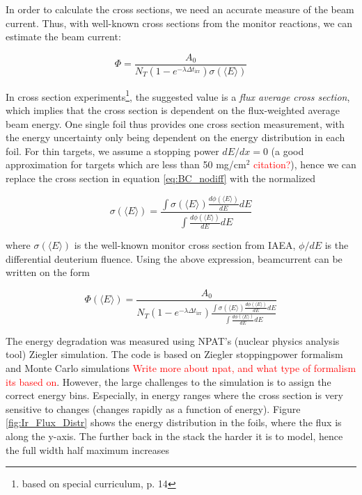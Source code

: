 \documentclass[a4paper,11pt,twoside]{book}
\begin{document}
\noindent 
In order to calculate the cross sections, we need an accurate measure of the beam current. Thus, with well-known cross sections from the monitor reactions, we can estimate the beam current: 

\begin{equation} \label{eq:BC_nodiff}
    \Phi = \frac{A_0}{N_T (1-e^{-\lambda \Delta t_\text{irr}})\sigma(\langle E\rangle)}
\end{equation}

\noindent 
In cross section experiments\footnote{based on special curriculum, p. 14}, the suggested value is a \textit{flux average cross section}, which implies that the cross section is dependent on the flux-weighted average beam energy. One single foil thus provides one cross section measurement, with the energy uncertainty only being dependent on the energy distribution in each foil. For thin targets, we assume a stopping power $dE/dx=0$ (a good approximation for targets which are less than 50 mg/cm$^2$ \textcolor{red}{citation?}), hence we can replace the cross section in equation \ref{eq:BC_nodiff} with the normalized 

\begin{equation}
    \sigma(\langle E \rangle) = \frac{\int \sigma(\langle E \rangle) \frac{d\phi(\langle E \rangle)}{dE}dE}{\int \frac{d\phi(\langle E \rangle)}{dE}dE}
\end{equation}

\noindent where $\sigma(\langle E \rangle)$ is the well-known monitor cross section from IAEA, $\phi/dE$ is the differential deuterium fluence.  Using the above expression, beamcurrent can be written on the form 

\begin{equation}
    \Phi(\langle E \rangle) = \frac{A_0}{N_T (1-e^{-\lambda \Delta t_\text{irr}})\frac{\int \sigma(\langle E \rangle) \frac{d\phi(\langle E \rangle)}{dE}dE}{\int \frac{d\phi(\langle E \rangle)}{dE}dE}}
\end{equation}

\noindent 
The energy degradation was measured using NPAT's (nuclear physics analysis tool) Ziegler simulation. The code is based on Ziegler stoppingpower formalism and Monte Carlo simulations \textcolor{red}{Write more about npat, and what type of formalism its based on}. However, the large challenges to the simulation is to assign the correct energy bins. Especially, in energy ranges where the cross section is very sensitive to changes (changes rapidly as a function of energy). Figure \ref{fig:Ir_Flux_Distr} shows the energy distribution in the foils, where the flux is along the y-axis. The further back in the stack the harder it is to model, hence the full width half maximum increases
\end{document}
